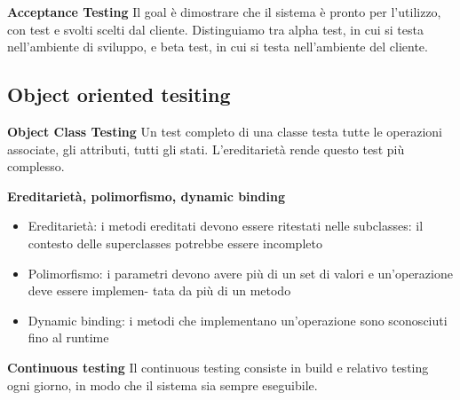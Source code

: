 \documentclass{article}
\begin{document}
\textbf{Acceptance Testing} Il goal è dimostrare che il sistema è pronto per l'utilizzo, con test e svolti scelti
dal cliente. Distinguiamo tra alpha test, in cui si testa nell'ambiente di sviluppo, e beta test, in cui si
testa nell'ambiente del cliente.


\subsection{Object oriented tesiting}

\textbf{Object Class Testing} Un test completo di una classe testa tutte le operazioni associate, gli attributi,
tutti gli stati. L'ereditarietà rende questo test più complesso.


\textbf{Ereditarietà, polimorfismo, dynamic binding}
\begin{itemize}
    \item Ereditarietà: i metodi ereditati devono essere ritestati nelle subclasses: il contesto delle superclasses
    potrebbe essere incompleto
    \item Polimorfismo: i parametri devono avere più di un set di valori e un'operazione deve essere implemen-
    tata da più di un metodo
    \item Dynamic binding: i metodi che implementano un'operazione sono sconosciuti fino al runtime
\end{itemize}
\textbf{Continuous testing} Il continuous testing consiste in build e relativo testing ogni giorno, in modo che
il sistema sia sempre eseguibile.
\end{document}
